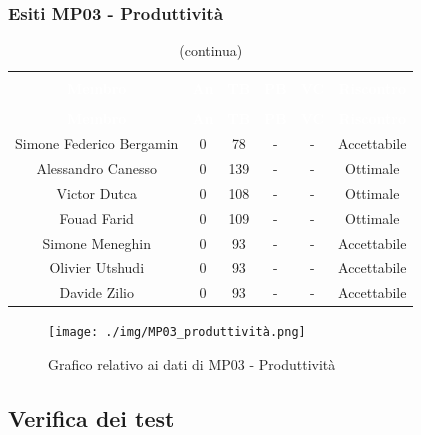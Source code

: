 \subsubsection{Esiti MP03 - Produttività} 
\begin{longtable}{c c c c c c}
\rowcolor{white}\caption{Esiti della Produttività} \\
		\rowcolor{redafk}
\textcolor{white}{\textbf{Membro}} &
\textcolor{white}{\textbf{An}} &
\textcolor{white}{\textbf{TB}} &
\textcolor{white}{\textbf{PB}} &
\textcolor{white}{\textbf{VC}} &
\textcolor{white}{\textbf{Riscontro}} \\
		\endfirsthead
		\rowcolor{white}\caption[]{(continua)} \\
		\rowcolor{redafk}
		\textcolor{white}{\textbf{Membro}} &
\textcolor{white}{\textbf{An}} &
\textcolor{white}{\textbf{TB}} &
\textcolor{white}{\textbf{PB}} &
\textcolor{white}{\textbf{VC}} &
\textcolor{white}{\textbf{Riscontro}} \\
		\endhead
Simone Federico Bergamin & 0 & 78 & - & - & Accettabile\\
Alessandro Canesso & 0 & 139 & - & - & Ottimale \\
Victor Dutca & 0 & 108 & - & - & Ottimale \\
Fouad Farid & 0 & 109 & - & - & Ottimale \\
Simone Meneghin & 0 & 93 & - & - & Accettabile\\
Olivier Utshudi & 0 & 93 & - & - & Accettabile\\
Davide Zilio & 0 & 93 & - & - & Accettabile
\end{longtable}

\begin{figure}[H]
\centering
\texttt{[image: ./img/MP03\_produttività.png]}
\caption{Grafico relativo ai dati di MP03 - Produttività}
\end{figure}

\subsection{Verifica dei test}
